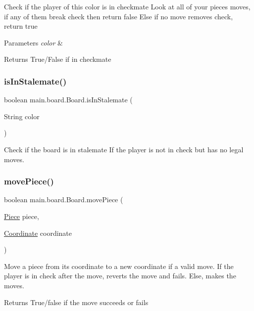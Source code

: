 Check if the player of this color is in checkmate Look at all of your piece\textquotesingle{}s moves, if any of them break check then return false Else if no move removes check, return true 
\begin{DoxyParams}{Parameters}
{\em color} & \\
\hline
\end{DoxyParams}
\begin{DoxyReturn}{Returns}
True/\+False if in checkmate 
\end{DoxyReturn}
\hypertarget{classmain_1_1board_1_1_board_ae0159180303ed34dc7a1d62280a16bb1}{}\label{classmain_1_1board_1_1_board_ae0159180303ed34dc7a1d62280a16bb1} 
\subsubsection{\texorpdfstring{is\+In\+Stalemate()}{isInStalemate()}}
{\footnotesize\ttfamily boolean main.\+board.\+Board.\+is\+In\+Stalemate (\begin{DoxyParamCaption}\item[{String}]{color }\end{DoxyParamCaption})}

Check if the board is in stalemate If the player is not in check but has no legal moves. \hypertarget{classmain_1_1board_1_1_board_a5c942b1bb9899558644f3b0fe17933ef}{}\label{classmain_1_1board_1_1_board_a5c942b1bb9899558644f3b0fe17933ef} 
\subsubsection{\texorpdfstring{move\+Piece()}{movePiece()}}
{\footnotesize\ttfamily boolean main.\+board.\+Board.\+move\+Piece (\begin{DoxyParamCaption}\item[{\hyperlink{classmain_1_1pieces_1_1_piece}{Piece}}]{piece,  }\item[{\hyperlink{classmain_1_1board_1_1_coordinate}{Coordinate}}]{coordinate }\end{DoxyParamCaption})}

Move a piece from its coordinate to a new coordinate if a valid move. If the player is in check after the move, reverts the move and fails. Else, makes the moves. \begin{DoxyReturn}{Returns}
True/false if the move succeeds or fails 
\end{DoxyReturn}
\hypertarget{classmain_1_1board_1_1_board_a4767a869c5e1833d02a80dc1f2f34d06}{}\label{classmain_1_1board_1_1_board_a4767a869c5e1833d02a80dc1f2f34d06} 
